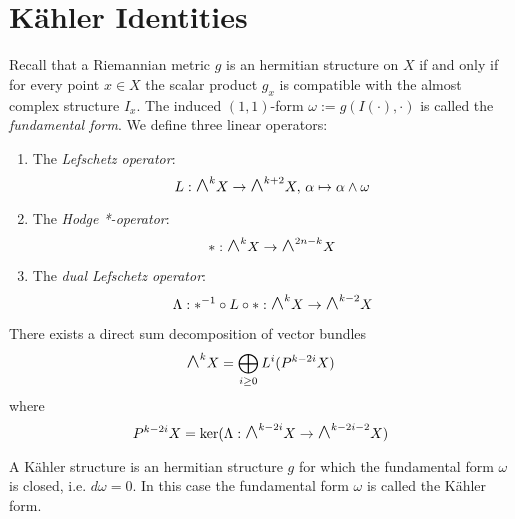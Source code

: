 \documentclass[12pt]{article}
\theoremstyle{plain}
\theoremstyle{definition}
\newcommand{\<}{\langle}
\renewcommand{\>}{\rangle}
\newcommand{\w}{\omega}
\newcommand{\bwedge}{\mbox{\Large $\wedge$}}
\begin{document}
\section{K{\"a}hler Identities}
Recall that a Riemannian metric $g$ is an hermitian structure on $X$ if and only if for every point $x \in X$ the scalar product $g_x$ is compatible with the almost complex structure $I_x$. The induced $(1, 1)$-form $\w := g(I(\cdot), \cdot)$ is called the \textit{fundamental form}. 
We define three linear operators:
\begin{enumerate}
\item The \textit{Lefschetz operator}: 
$$ L : \bwedge^k X \to \bwedge^{k + 2} X, \, \alpha \mapsto \alpha \wedge \w $$
\item The \textit{Hodge *-operator}: 
$$ * : \bwedge^k X \to \bwedge^{2n - k} X $$
\item The \textit{dual Lefschetz operator}: 
$$ \Lambda : *^{-1} \circ L \circ * : \bwedge^k X \to \bwedge^{k - 2} X $$
\end{enumerate}
There exists a direct sum decomposition of vector bundles 
$$ \bwedge^k X = \bigoplus_{i \ge 0} L^i(P^{k - 2 i} X) $$
where 
$$ P^{k - 2i} X = \ker(\Lambda : \bwedge^{k - 2i} X \to \bwedge^{k - 2i - 2} X) $$

A K{\"a}hler structure is an hermitian structure $g$ for which the fundamental form $\w$ is closed, i.e. $d \w = 0$. In this case the fundamental form $\w$ is called the K{\"a}hler form. 
\end{document}
